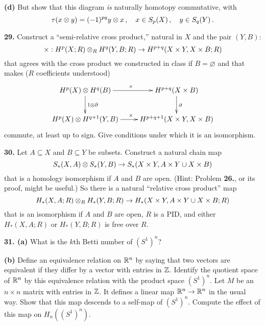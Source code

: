 \documentclass[12pt]{article}
\begin{document}
{\bf(d)} But show that this diagram {\em is} naturally homotopy 
commutative, with 
\[
\tau(x\otimes y)=(-1)^{pq}y\otimes x\,,\quad x\in S_p(X)\,,\quad y\in S_q(Y)\,.
\]

\medskip
{\bf 29.} Construct a ``semi-relative cross product,'' 
natural in $X$ and the pair $(Y,B)$:
\[
\times:H^p(X;R)\otimes_R H^q(Y,B;R)\to H^{p+q}(X\times Y,X\times B;R)
\]
that agrees with the cross product we constructed in class if $B=\varnothing$ 
and that makes ($R$ coefficients understood)
\[
\xymatrix{
H^p(X)\tensor H^q(B) \ar[r]^\times \ar[d]^{1\tensor\partial} & 
H^{p+q}(X\times B) \ar[d]^\partial \\
H^p(X)\tensor H^{q+1}(Y,B) \ar[r]^\times & H^{p+q+1}(X\times Y,X\times B)
}
\]
commute, at least up to sign. Give conditions under which it is an isomorphism.

\medskip
{\bf 30.} Let $A\subseteq X$ and $B\subseteq Y$ be subsets. 
Construct a natural chain map
\[
S_*(X,A)\otimes S_*(Y,B)\to S_*(X\times Y,A\times Y\cup X\times B)
\]
that is a homology isomorphism if $A$ and $B$ are open. (Hint: Problem 
{\bf 26.}, or its proof, might be useful.) So 
there is a natural ``relative cross product'' map
\[
H_*(X,A;R)\otimes_R H_*(Y,B;R)\to H_*(X\times Y,A\times Y\cup X\times B;R)
\]
that is an isomorphism if $A$ and $B$ are open, $R$ is a PID, and either 
$H_*(X,A;R)$ or $H_*(Y,B;R)$ is free over $R$.

\medskip
{\bf 31. (a)} What is the $k$th Betti number of $(S^1)^n$?

{\bf(b)} Define an equivalence relation on $\mathbb R^n$ by saying that two vectors
are equivalent if they differ by a vector with entries in $\mathbb Z$. Identify the
quotient space of $\mathbb R^n$ by this equivalence relation with the product space 
$(S^1)^n$. Let $M$ be an $n\times n$ matrix with entries in $\mathbb Z$. 
It defines a linear map $\mathbb R^n\to\mathbb R^n$ in the usual way. Show that this
map descends to a self-map of $(S^1)^n$. Compute the effect of this map on
$H_n((S^1)^n)$. 
\end{document}
